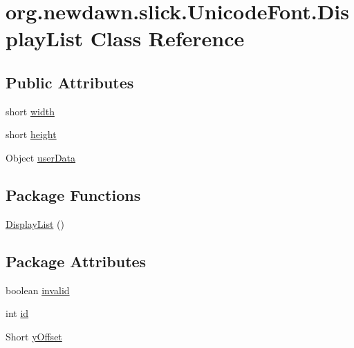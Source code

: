 \hypertarget{classorg_1_1newdawn_1_1slick_1_1_unicode_font_1_1_display_list}{}\section{org.\+newdawn.\+slick.\+Unicode\+Font.\+Display\+List Class Reference}
\label{classorg_1_1newdawn_1_1slick_1_1_unicode_font_1_1_display_list}
\subsection*{Public Attributes}
\begin{DoxyCompactItemize}
\item 
short \mbox{\hyperlink{classorg_1_1newdawn_1_1slick_1_1_unicode_font_1_1_display_list_adc52c0c9c9cf61d6c0823df6c6cdb501}{width}}
\item 
short \mbox{\hyperlink{classorg_1_1newdawn_1_1slick_1_1_unicode_font_1_1_display_list_a35082132688969ec524ffcf153f0daef}{height}}
\item 
Object \mbox{\hyperlink{classorg_1_1newdawn_1_1slick_1_1_unicode_font_1_1_display_list_a20685c5ef376d858c57bac7aa7620a26}{user\+Data}}
\end{DoxyCompactItemize}
\subsection*{Package Functions}
\begin{DoxyCompactItemize}
\item 
\mbox{\hyperlink{classorg_1_1newdawn_1_1slick_1_1_unicode_font_1_1_display_list_a32f101f3734423620bfeda8b6a6e728c}{Display\+List}} ()
\end{DoxyCompactItemize}
\subsection*{Package Attributes}
\begin{DoxyCompactItemize}
\item 
boolean \mbox{\hyperlink{classorg_1_1newdawn_1_1slick_1_1_unicode_font_1_1_display_list_a16ecede9614b638dc2c1e3e5803cc998}{invalid}}
\item 
int \mbox{\hyperlink{classorg_1_1newdawn_1_1slick_1_1_unicode_font_1_1_display_list_abedb098a7619879ad98ed8725bd08085}{id}}
\item 
Short \mbox{\hyperlink{classorg_1_1newdawn_1_1slick_1_1_unicode_font_1_1_display_list_aa45d830b3fa4ef6fcd9ca21ad572a668}{y\+Offset}}
\end{DoxyCompactItemize}



